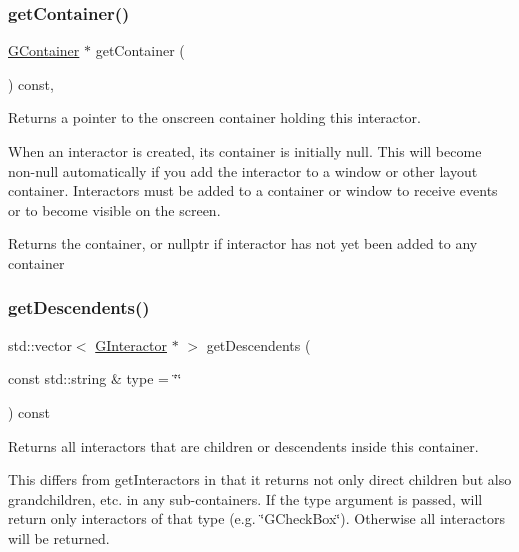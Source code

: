 \subsubsection{\texorpdfstring{get\+Container()}{getContainer()}}
{\footnotesize\ttfamily \mbox{\hyperlink{classGContainer}{G\+Container}} $\ast$ get\+Container (\begin{DoxyParamCaption}{ }\end{DoxyParamCaption}) const\hspace{0.3cm}{\ttfamily [virtual]}, {\ttfamily [inherited]}}



Returns a pointer to the onscreen container holding this interactor. 

When an interactor is created, its container is initially null. This will become non-\/null automatically if you add the interactor to a window or other layout container. Interactors must be added to a container or window to receive events or to become visible on the screen. \begin{DoxyReturn}{Returns}
the container, or nullptr if interactor has not yet been added to any container 
\end{DoxyReturn}
\mbox{\label{classGContainer_a9580b7f6ee0dc339f75bafd4e319f3ad}} 
\subsubsection{\texorpdfstring{get\+Descendents()}{getDescendents()}}
{\footnotesize\ttfamily std\+::vector$<$ \mbox{\hyperlink{classGInteractor}{G\+Interactor}} $\ast$ $>$ get\+Descendents (\begin{DoxyParamCaption}\item[{const std\+::string \&}]{type = {\ttfamily \char`\"{}\char`\"{}} }\end{DoxyParamCaption}) const\hspace{0.3cm}{\ttfamily [virtual]}}



Returns all interactors that are children or descendents inside this container. 

This differs from get\+Interactors in that it returns not only direct children but also grandchildren, etc. in any sub-\/containers. If the type argument is passed, will return only interactors of that type (e.\+g. \char`\"{}\+G\+Check\+Box\char`\"{}). Otherwise all interactors will be returned. \mbox{\label{classGInteractor_a894a5502900794eeb27d084c21f1d77d}} 
